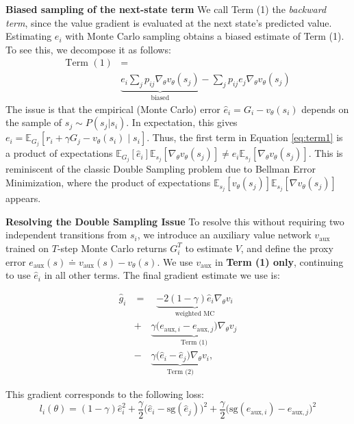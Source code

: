\documentclass{article}
\theoremstyle{plain}
\theoremstyle{definition}
\theoremstyle{remark}
\begin{document}
\textbf{Biased sampling of the next-state term}
We call Term (1) the \textit{backward term}, since the value gradient is evaluated at the next state's predicted value. Estimating $e_i$ with Monte Carlo sampling obtains a biased estimate of Term (1). To see this, we decompose it as follows:
\begin{align}
\text{Term } (1) &= \nonumber \\  &\underbrace{e_i\sum_jp_{ij}
  \nabla_\theta v_\theta(s_j)}_{\text{biased}} - \sum_jp_{ij}
  e_j\nabla_\theta  v_\theta(s_j) \label{eq:term1}
\end{align}
The issue is that the empirical (Monte Carlo) error $\hat{e}_i = G_i - v_\theta(s_i)$ depends on the sample of $s_j  \sim P(s_j | s_i)$. In expectation, this gives $e_i = \mathbb{E}_{G_j}[r_i + \gamma G_j - v_\theta(s_i) \mid s_i]$. Thus, the first term in Equation \ref{eq:term1} is a product of expectations $\mathbb{E}_{G_j}[\hat{e}_i]\mathbb{E}_{s_j}[\nabla_\theta v_\theta(s_j)] \neq e_i \mathbb{E}_{s_j}[\nabla_\theta v_\theta(s_j)]$. This is reminiscent of the classic Double Sampling problem due to Bellman Error Minimization, where the product of expectations $\mathbb{E}_{s_j}[v_\theta(s_j)]\mathbb{E}_{s_j}[\nabla v_\theta(s_j)]$ appears.

\textbf{Resolving the Double Sampling Issue}
To resolve this without requiring two independent transitions from $s_i$, we introduce an auxiliary value network $v_{\text{aux}}$ trained on $T$-step Monte Carlo returns $G_i^T$ to estimate $V$, and define the proxy error $e_{\text{aux}}(s) \doteq v_{\text{aux}}(s) - v_\theta(s)$. We use $v_{\text{aux}}$ in \textbf{Term (1) only}, continuing to use $\hat{e}_i$ in all other terms. The final gradient estimate we use is:

\begin{align}
    \hat{g}_i &= \quad \underbrace{-2(1-\gamma)\hat{e}_i \nabla_\theta v_i}_{\text{weighted MC}} \nonumber \\
    &+ \quad \underbrace{\gamma \big(e_{\text{aux},i} - e_{\text{aux},j}\big)\nabla_\theta v_j}_{\text{Term (1)}} \nonumber \\
    &- \quad \underbrace{\gamma \big(\hat{e}_i - \hat{e}_j\big)\nabla_\theta v_i}_{\text{Term (2)}}, \label{eq:full_sample_grad}
\end{align}

This gradient corresponds to the following loss:
$$\boxed{l_i(\theta) = (1-\gamma)\hat{e}_i^2 + \frac{\gamma}{2}\Big(\hat{e}_i - \text{sg}(\hat{e}_j)\Big)^2 + \frac{\gamma}{2}\Big(\text{sg}(e_{\text{aux},i}) - e_{\text{aux},j}\Big)^2}$$
\end{document}
